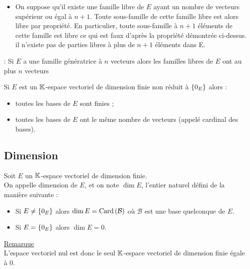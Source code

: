 \begin{dem}
\begin{itemize}
        \item On suppose qu’il existe une famille libre de \(E\) ayant un nombre de vecteurs supérieur ou égal à \(n + 1\).
        Toute sous-famille de cette famille libre est alors libre par propriété. En particulier, toute sous-famille à \(n + 1\) éléments de cette famille est libre ce qui est faux d’après la propriété démontrée ci-dessus.\\
        \conclusion il n’existe pas de parties libres à plus de \(n + 1\) éléments dans E.
    \end{itemize}
    \conclusion : Si \(E\) a une famille génératrice à \(n\) vecteurs alors les familles libres de \(E\) ont au plus \(n\) vecteurs
\end{dem}
\begin{defprop}
    Si \(E\) est un \(\mathbb{K}\)-espace vectoriel de dimension finie non réduit à \(\left\lbrace0_E\right\rbrace\) alors :
    \begin{itemize}
        \item toutes les bases de \(E\) sont finies ;
        \item toutes les bases de \(E\) ont le même nombre de vecteurs (appelé cardinal des bases).
    \end{itemize}
\end{defprop}

\subsection{Dimension}
\begin{defi}
    Soit \(E\) un \(\mathbb{K}\)-espace vectoriel de dimension finie.\\
    On appelle dimension de \(E\), et on note \(\dim{E}\), l’entier naturel défini de la manière suivante :
    \begin{itemize}
        \item Si \(E\neq \left\lbrace0_E\right\rbrace\) alors \(\dim{E} = \operatorname{Card}\left(\mathcal{B}\right)\) où \(\mathcal{B}\) est une base quelconque de \(E\).
        \item Si \(E = \left\lbrace0_E\right\rbrace\) alors \(\dim{E} = 0\).
    \end{itemize}
    \underline{Remarque}\\
    L’espace vectoriel nul est donc le seul \(\mathbb{K}\)-espace vectoriel de dimension finie égale à \(0\).
\end{defi}

